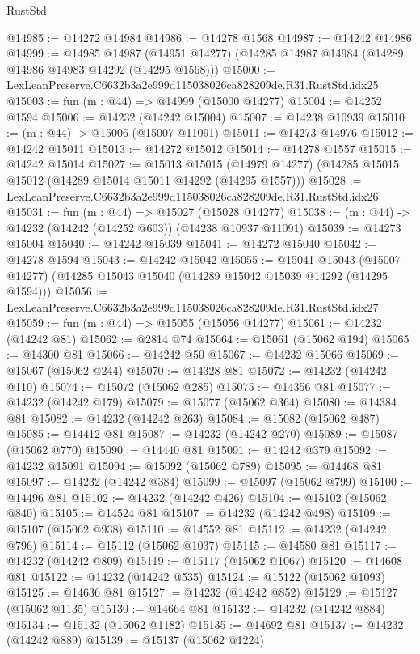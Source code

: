 \begin{lexlean}{RustStd}
\begin{coremodule}
@14985 := @14272 @14984
@14986 := @14278 @1568
@14987 := @14242 @14986
@14999 := @14985
    @14987
    (@14951 @14277)
    (@14285 @14987 @14984 (@14289 @14986 @14983 @14292 (@14295 @1568)))
@15000 := LexLeanPreserve.C6632b3a2e999d115038026ca828209de.R31.RustStd.idx25
@15003 := fun (m : @44) => @14999 (@15000 @14277)
@15004 := @14252 @1594
@15006 := @14232 (@14242 @15004)
@15007 := @14238 @10939
@15010 := (m : @44) -> @15006 (@15007 @11091)
@15011 := @14273 @14976
@15012 := @14242 @15011
@15013 := @14272 @15012
@15014 := @14278 @1557
@15015 := @14242 @15014
@15027 := @15013
    @15015
    (@14979 @14277)
    (@14285 @15015 @15012 (@14289 @15014 @15011 @14292 (@14295 @1557)))
@15028 := LexLeanPreserve.C6632b3a2e999d115038026ca828209de.R31.RustStd.idx26
@15031 := fun (m : @44) => @15027 (@15028 @14277)
@15038 := (m : @44) -> @14232 (@14242 (@14252 @603)) (@14238 @10937 @11091)
@15039 := @14273 @15004
@15040 := @14242 @15039
@15041 := @14272 @15040
@15042 := @14278 @1594
@15043 := @14242 @15042
@15055 := @15041
    @15043
    (@15007 @14277)
    (@14285 @15043 @15040 (@14289 @15042 @15039 @14292 (@14295 @1594)))
@15056 := LexLeanPreserve.C6632b3a2e999d115038026ca828209de.R31.RustStd.idx27
@15059 := fun (m : @44) => @15055 (@15056 @14277)
@15061 := @14232 (@14242 @81)
@15062 := @2814 @74
@15064 := @15061 (@15062 @194)
@15065 := @14300 @81
@15066 := @14242 @50
@15067 := @14232 @15066
@15069 := @15067 (@15062 @244)
@15070 := @14328 @81
@15072 := @14232 (@14242 @110)
@15074 := @15072 (@15062 @285)
@15075 := @14356 @81
@15077 := @14232 (@14242 @179)
@15079 := @15077 (@15062 @364)
@15080 := @14384 @81
@15082 := @14232 (@14242 @263)
@15084 := @15082 (@15062 @487)
@15085 := @14412 @81
@15087 := @14232 (@14242 @270)
@15089 := @15087 (@15062 @770)
@15090 := @14440 @81
@15091 := @14242 @379
@15092 := @14232 @15091
@15094 := @15092 (@15062 @789)
@15095 := @14468 @81
@15097 := @14232 (@14242 @384)
@15099 := @15097 (@15062 @799)
@15100 := @14496 @81
@15102 := @14232 (@14242 @426)
@15104 := @15102 (@15062 @840)
@15105 := @14524 @81
@15107 := @14232 (@14242 @498)
@15109 := @15107 (@15062 @938)
@15110 := @14552 @81
@15112 := @14232 (@14242 @796)
@15114 := @15112 (@15062 @1037)
@15115 := @14580 @81
@15117 := @14232 (@14242 @809)
@15119 := @15117 (@15062 @1067)
@15120 := @14608 @81
@15122 := @14232 (@14242 @535)
@15124 := @15122 (@15062 @1093)
@15125 := @14636 @81
@15127 := @14232 (@14242 @852)
@15129 := @15127 (@15062 @1135)
@15130 := @14664 @81
@15132 := @14232 (@14242 @884)
@15134 := @15132 (@15062 @1182)
@15135 := @14692 @81
@15137 := @14232 (@14242 @889)
@15139 := @15137 (@15062 @1224)

\end{coremodule}
\end{lexlean}
